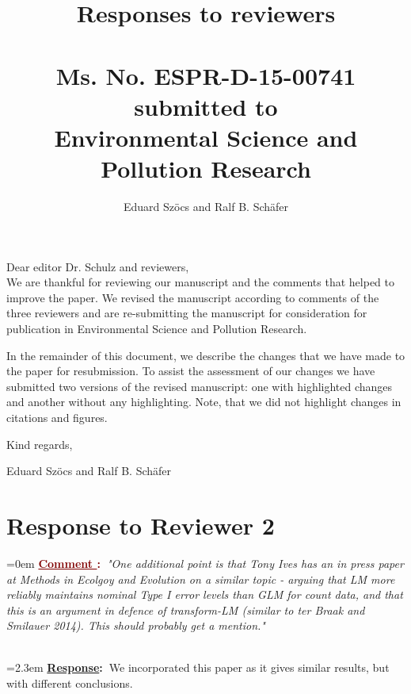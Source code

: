 \documentclass[12pt]{article}
\newcounter{cN}
\newcommand{\comment}[1]{
	\vspace{2em} 
	\refstepcounter{cN} %
	\noindent \hangindent=0em \textbf{\textcolor{Maroon}{\uline{Comment \thecN}:~}}\emph{"#1"}
	}
\newcommand{\response}[1]{
	\\[0.25em] 
	\hangindent=2.3em \textbf{\textcolor{NavyBlue}{\uline{Response}:~}}#1 
	}
\begin{document}
\title{Responses to reviewers\\~\\Ms. No. ESPR-D-15-00741\\submitted to\\Environmental Science and Pollution Research}

\author{Eduard Szöcs and Ralf B. Schäfer}

\maketitle
\noindent Dear editor Dr. Schulz  and reviewers,\\

We are thankful for reviewing our manuscript and the comments that helped to improve the paper. 
We revised the manuscript according to comments of the three reviewers and are re-submitting the manuscript for consideration for publication in Environmental Science and Pollution Research. 

In the remainder of this document, we describe the changes that we have made to the paper for resubmission. 
To assist the assessment of our changes we have submitted two versions of the revised manuscript: one with highlighted changes and another without any highlighting. 
Note, that we did not highlight changes in citations and figures.

\vspace{2em}
\hfill Kind regards,

\hfill Eduard Szöcs and Ralf B. Schäfer
\newpage








\section{Response to Reviewer 2}
\vspace{-2em}

\comment{One additional point is that Tony Ives has an in press paper at Methods in Ecolgoy and Evolution on a similar topic - arguing that LM more reliably maintains nominal Type I error levels than GLM for count data, and that this is an argument in defence of transform-LM (similar to ter Braak and Smilauer 2014). This should probably get a mention.}
\response{We incorporated this paper as it gives similar results, but with different conclusions. \todo{noch machen!}}
\end{document}
